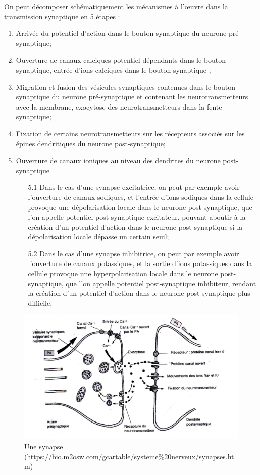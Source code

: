\documentclass[12pt]{scrartcl}
\begin{document}
On peut décomposer schématiquement les mécanismes à l'œuvre dans la transmission synaptique en 5 étapes :
\begin{enumerate}
\item Arrivée du potentiel d'action dans le bouton synaptique du neurone pré-synaptique;
\item Ouverture de canaux calciques potentiel-dépendants dans le bouton synaptique, entrée d'ions calciques dans le bouton synaptique ;
\item Migration et fusion des vésicules synaptiques contenues dans le bouton synaptique du neurone pré-synaptique et contenant les neurotransmetteurs avec la membrane, exocytose des neurotransmetteurs dans la fente synaptique;
\item Fixation de certains neurotransmetteurs sur les récepteurs associés sur les épines dendritiques du neurone post-synaptique;
\item Ouverture de canaux ioniques au niveau des dendrites du neurone post-synaptique
\begin{enumerate}
\item [5.1] Dans le cas d'une synapse excitatrice, on peut par exemple avoir l'ouverture de canaux sodiques, et l'entrée d'ions sodiques dans la cellule provoque une dépolarisation locale dans le neurone post-synaptique, que l'on appelle potentiel post-synaptique excitateur, pouvant aboutir à la création d'un potentiel d'action dans le neurone post-synaptique si la dépolarisation locale dépasse un certain seuil;
\item [5.2] Dans le cas d'une synapse inhibitrice, on peut par exemple avoir l'ouverture de canaux potassiques, et la sortie d'ions potassiques dans la cellule provoque une hyperpolarisation locale dans le neurone post-synaptique, que l'on appelle potentiel post-synaptique inhibiteur, rendant la création d'un potentiel d'action dans le neurone post-synaptique plus difficile.
\end{enumerate}
\end{enumerate}


\begin{figure}[!h]
\centering
\includegraphics[scale=1.2]{imgs/3.jpg}
\caption{Une synapse \scriptsize{(https://bio.m2osw.com/gcartable/systeme\%20nerveux/synapses.htm)}}
\label{synapse}
\end{figure}
\end{document}
